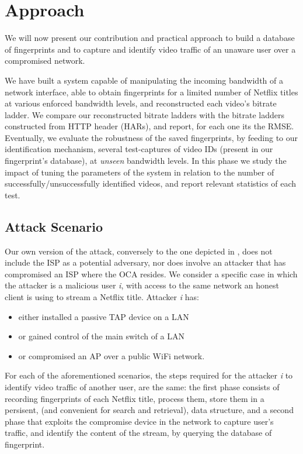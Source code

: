 \chapter{Approach}\label{sec:approach}

We will now present our contribution and practical approach to build a database
of fingerprints and to capture and identify video traffic of an unaware user
over a compromised network.

We have built a system capable of manipulating the incoming bandwidth of a
network interface, able to obtain fingerprints for a limited number of Netflix
titles at various enforced bandwidth levels, and reconstructed each video's
bitrate ladder. We compare our reconstructed bitrate ladders with the bitrate
ladders constructed from HTTP header (HARs), and report, for each one its the
RMSE. Eventually, we evaluate the robustness of the saved fingerprints, by
feeding to our identification mechanism, several test-captures of video IDs
(present in our fingerprint's database), at \emph{unseen} bandwidth levels. In
this phase we study the impact of tuning the parameters of the system in
relation to the number of successfully/unsuccessfully identified videos, and
report relevant statistics of each test.

\section{Attack Scenario}

Our own version of the attack, conversely to the one depicted in
, does not include the ISP as a potential adversary, nor does
involve an attacker that has compromised an ISP where the OCA resides. We
consider a specific case in which the attacker is a malicious user \emph{i},
with access to the same network an honest client is using to stream a Netflix
title. Attacker \emph{i} has:

\begin{itemize}
    \item either installed a passive TAP device on a LAN
    \item or gained control of the main switch of a LAN
    \item or compromised an AP over a public WiFi network.
\end{itemize}

For each of the aforementioned scenarios, the steps required for the attacker
\emph{i} to identify video traffic of another user, are the same: the first
phase consists of recording fingerprints of each Netflix title, process them,
store them in a persisent, (and convenient for search and retrieval), data
structure, and a second phase that exploits the compromise device in the
network to capture user's traffic, and identify the content of the stream, by
querying the database of fingerprint.

